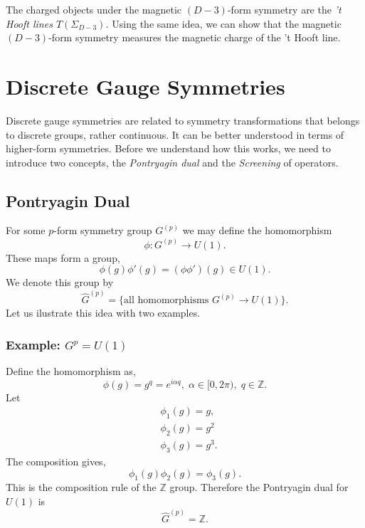 \documentclass{article}
\begin{document}
The charged objects under the magnetic $(D-3)$-form symmetry are the \textit{'t Hooft lines $T(\Sigma_{D-3})$.} Using the same idea, we can show that the magnetic $(D-3)$-form symmetry measures the magnetic charge of the 't Hooft line. 
\section{Discrete Gauge Symmetries}
Discrete gauge symmetries are related to symmetry transformations that belongs to discrete groups, rather continuous. It can be better understood in terms of higher-form symmetries. Before we understand how this works, we need to introduce two concepts, the \textit{Pontryagin dual} and the \textit{Screening} of operators. 

\subsection{Pontryagin Dual}
For some $p$-form symmetry group $G^{(p)}$ we may define the homomorphism 
\begin{equation}
	\phi:G^{(p)}\to U(1). 
\end{equation}
These maps form a group, 
\begin{equation}
	\phi(g)\phi'(g)=(\phi\phi')(g)\in U(1).
\end{equation}
We denote this group by 
\begin{equation}
	\widehat{G}^{(p)}=\{\text{all homomorphisms }G^{(p)}\to U(1) \}.
\end{equation}
Let us ilustrate this idea with two examples. 
\subsubsection*{Example: $G^{p}=U(1)$}
Define the homomorphism as,
\begin{equation}
	\phi(g)=g^q=e^{i\alpha q},\; \alpha\in [0,2\pi),\;q\in\mathbb{Z}.
\end{equation}
Let 
\begin{align}
	&\phi_1(g)=g,\\
	&\phi_2(g)=g^2\\
	&\phi_3(g)=g^3.
\end{align}
The composition gives, 
\begin{equation}
	\phi_1(g)\phi_2(g)=\phi_3(g). 
\end{equation}
This is the composition rule of the $\mathbb{Z}$ group. Therefore the Pontryagin dual for $U(1)$ is 
\begin{equation}
	\widehat{G}^{(p)}=\mathbb{Z}.
\end{equation}
\end{document}
